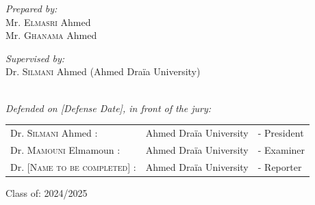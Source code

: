 \documentclass[a4paper,12pt]{report}
\begin{document}
\begin{titlepage}
		\noindent
		\begin{minipage}{0.5\textwidth}
			\vspace{-7mm}
			\begin{flushleft} \large
				\emph{Prepared by:}\\
				Mr. \textsc{Elmasri} Ahmed \\
				Mr. \textsc{Ghanama} Ahmed \\
			\end{flushleft}
		\end{minipage}
		\begin{minipage}{0.4\textwidth}
			\begin{flushright} \large
				\begin{flushleft} \large
					\emph{Supervised by:} \\
					Dr. \textsc{Silmani} Ahmed (Ahmed Draïa University)\\[0.1cm]
				\end{flushleft}
			\end{flushright}
		\end{minipage}\\[1cm]
		
		{\large \textit{Defended on [Defense Date], in front of the jury: }}\\[0.5cm]
		
		\centering
		\begin{tabular}{lll}
			\large Dr. \textsc{Silmani} Ahmed : & \large Ahmed Draïa University & \large - President \\[0.1cm]
			\large Dr. \textsc{Mamouni} Elmamoun : & \large Ahmed Draïa University & \large - Examiner \\[0.1cm]
			\large Dr. \textsc{[Name to be completed]} : & \large Ahmed Draïa University & \large - Reporter
		\end{tabular}
		
		\vspace{10mm}
		{\large Class of: 2024/2025}
		
	\end{titlepage}
\end{document}
